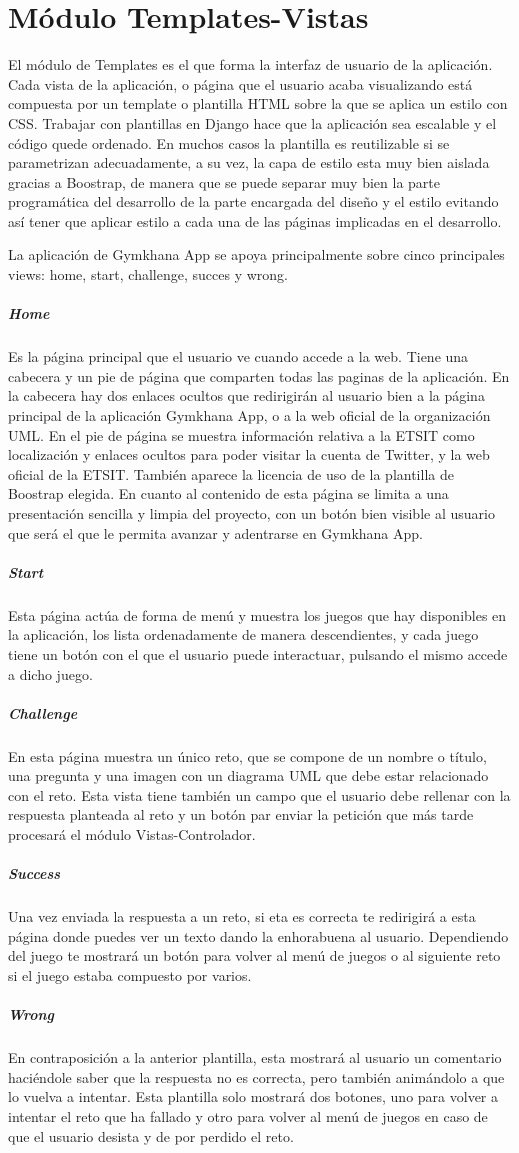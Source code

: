 \documentclass[a4paper, 12pt]{book}
\begin{document}
\section{Módulo Templates-Vistas}
El módulo de Templates es el que forma la interfaz de usuario de la aplicación. Cada vista de la aplicación, o página que el usuario acaba visualizando está compuesta por un template o plantilla HTML sobre la que se aplica un estilo con CSS. Trabajar con plantillas en Django hace que la aplicación sea escalable y el código quede ordenado. En muchos casos la plantilla es reutilizable si se parametrizan adecuadamente, a su vez, la capa de estilo esta muy bien aislada gracias a Boostrap, de manera que se puede separar muy bien la parte programática del desarrollo de la parte encargada del diseño y el estilo evitando así tener que aplicar estilo a cada una de las páginas implicadas en el desarrollo. 

La aplicación de Gymkhana App se apoya principalmente sobre cinco principales views: home, start, challenge, succes y wrong.
\subparagraph{Home}
Es la página principal que el usuario ve cuando accede a la web. Tiene una cabecera y un pie de página que comparten todas las paginas de la aplicación. En la cabecera hay dos enlaces ocultos que redirigirán al usuario bien a la página principal de la aplicación Gymkhana App, o a la web oficial de la organización UML. En el pie de página se muestra información relativa a la ETSIT como localización y enlaces ocultos para poder visitar la cuenta de Twitter, y la web oficial de la ETSIT. También aparece la licencia de uso de la plantilla de Boostrap elegida. En cuanto al contenido de esta página se limita a una presentación sencilla y limpia del proyecto, con un botón bien visible al usuario que será el que le permita avanzar y adentrarse en Gymkhana App. 
\subparagraph{Start}
Esta página actúa de forma de menú y muestra los juegos que hay disponibles en la aplicación, los lista ordenadamente de manera descendientes, y cada juego tiene un botón con el que el usuario puede interactuar, pulsando el mismo accede a dicho juego.  
\subparagraph{Challenge} 
En esta página muestra un único reto, que se compone de un nombre o título, una pregunta y una imagen con un diagrama UML que debe estar relacionado con el reto. Esta vista tiene también un campo que el usuario debe rellenar con la respuesta planteada al reto y un botón par enviar la petición que más tarde procesará el módulo Vistas-Controlador.
\subparagraph{Success}
Una vez enviada la respuesta a un reto, si eta es correcta te redirigirá a esta página donde puedes ver un texto dando la enhorabuena al usuario. Dependiendo del juego te mostrará un botón para volver al menú de juegos o al siguiente reto si el juego estaba compuesto por varios. 
\subparagraph{Wrong}
En contraposición a la anterior plantilla, esta mostrará al usuario un comentario haciéndole saber que la respuesta no es correcta, pero también animándolo a que lo vuelva a intentar. Esta plantilla solo mostrará dos botones, uno para volver a intentar el reto que ha fallado y otro para volver al menú de juegos en caso de que el usuario desista y de por perdido el reto. 
\end{document}
